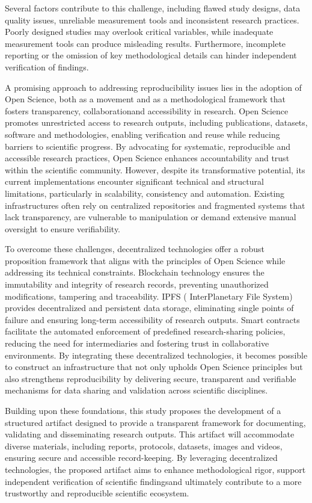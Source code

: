 \documentclass{article}
\begin{document}
Several factors contribute to this challenge, including flawed study designs, data quality issues, unreliable measurement tools and inconsistent research practices. Poorly designed studies may overlook critical variables, while inadequate measurement tools can produce misleading results. Furthermore, incomplete reporting or the omission of key methodological details can hinder independent verification of findings.

A promising approach to addressing reproducibility issues lies in the adoption of Open Science, both as a movement and as a methodological framework that fosters transparency, collaborationand accessibility in research. Open Science promotes unrestricted access to research outputs, including publications, datasets, software and methodologies, enabling verification and reuse while reducing barriers to scientific progress. By advocating for systematic, reproducible and accessible research practices, Open Science enhances accountability and trust within the scientific community. However, despite its transformative potential, its current implementations encounter significant technical and structural limitations, particularly in scalability, consistency and automation. Existing infrastructures often rely on centralized repositories and fragmented systems that lack transparency, are vulnerable to manipulation or demand extensive manual oversight to ensure verifiability.

To overcome these challenges, decentralized technologies offer a robust proposition framework that aligns with the principles of Open Science while addressing its technical constraints. Blockchain technology ensures the immutability and integrity of research records, preventing unauthorized modifications, tampering and traceability. IPFS ( InterPlanetary File System) provides decentralized and persistent data storage, eliminating single points of failure and ensuring long-term accessibility of research outputs. Smart contracts facilitate the automated enforcement of predefined research-sharing policies, reducing the need for intermediaries and fostering trust in collaborative environments. By integrating these decentralized technologies, it becomes possible to construct an infrastructure that not only upholds Open Science principles but also strengthens reproducibility by delivering secure, transparent and verifiable mechanisms for data sharing and validation across scientific disciplines.

Building upon these foundations, this study proposes the development of a structured artifact designed to provide a transparent framework for documenting, validating and disseminating research outputs. This artifact will accommodate diverse materials, including reports, protocols, datasets, images and videos, ensuring secure and accessible record-keeping. By leveraging decentralized technologies, the proposed artifact aims to enhance methodological rigor, support independent verification of scientific findingsand ultimately contribute to a more trustworthy and reproducible scientific ecosystem.
\end{document}
